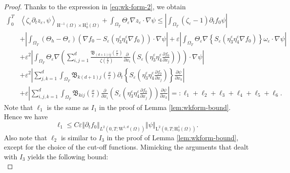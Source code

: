 \documentclass[10pt,a4paper]{amsart}
\newcommand{\eps}{\varepsilon}
\newcommand{\xeps}{\left(\frac{x}{\varepsilon}\right)}
\begin{document}
\begin{proof}
Thanks to the expression in \eqref{eq:wk-form-2}, we obtain 
\begin{equation*}
\begin{aligned}
\int_0^T & \left\langle \zeta_\eps\partial_{t}z_{\varepsilon},\psi \right\rangle_{\mathrm{H}^{-1}(\Omega) \times \mathrm{H}_0^1(\Omega)} 
+ \int_{\Omega_T} \Theta_\eps\nabla z_{\varepsilon} \cdot \nabla \psi
\le \left\vert \int_{\Omega_T} (\zeta_\eps -1)\partial_{t}f_{0}\psi \right\vert
\\
& 
+ \left\vert \int_{\Omega_T}\left(\Theta_h - \Theta_\eps\right) \left( \nabla f_0 - S_\eps \left( \eta_3^\eps \eta_4^\eps \nabla f_0 \right) \right) \cdot \nabla \psi \right\vert
+ \eps \left\vert \int_{\Omega_T} \Theta_\eps \nabla \left\{S_\eps \left( \eta_3^\eps \eta_4^\eps \nabla f_0 \right)\right\} \omega_\eps \cdot \nabla \psi \right\vert
\\
& + \eps^2 \left\vert \int_{\Omega_T} \Theta_\eps\nabla \left(\sum_{i,j=1}^d \frac{\mathfrak{B}_{(d+1)ij}\xeps}{\zeta\xeps} \frac{\partial}{\partial x_i} \left(S_\eps \left( \eta_3^\eps \eta_4^\eps \frac{\partial f_0}{\partial x_j}\right)\right)\right) \cdot \nabla \psi \right\vert
\\
& + \eps^2 \left\vert \sum_{j,k=1}^d \int_{\Omega_T} \mathfrak{B}_{k(d+1)j}\xeps \partial_t \left\{S_\eps \left( \eta_3^\eps \eta_4^\eps \frac{\partial f_0}{\partial x_j} \right)\right\} \frac{\partial\psi}{\partial x_k} \right\vert
\\
& + \eps \left\vert \sum_{i,j,k=1}^d \int_{\Omega_T} \mathfrak{B}_{kij}\xeps \frac{\partial}{\partial x_i} \left( S_\eps \left( \eta_3^\eps \eta_4^\eps \frac{\partial f_0}{\partial x_j} \right)\right) \frac{\partial\psi}{\partial x_k} \right\vert =: \ell_1 + \ell_2 + \ell_3 + \ell_4 + \ell_5 + \ell_6.
\end{aligned}
\end{equation*}
Note that $\ell_1$ is the same as $I_1$ in the proof of Lemma \ref{lem:wkform-bound}. Hence we have
\begin{equation}\label{eq:bd-ell-1}
\ell_1 \le C \eps\left\Vert \partial_t f_0 \right\Vert_{L^2(0,T;\mathrm W^{1,d}(\Omega))} \left\Vert \psi\right\Vert_{\mathrm L^2(0,T;\mathrm H^1_0(\Omega))} .
\end{equation}
Also note that $\ell_2$ is similar to $I_3$ in the proof of Lemma \ref{lem:wkform-bound}, except for the choice of the cut-off functions. Mimicking the arguments that dealt with $I_3$ yields the following bound:
\begin{equation}\label{eq:bd-ell-2}

\end{equation}
\end{proof}
\end{document}
